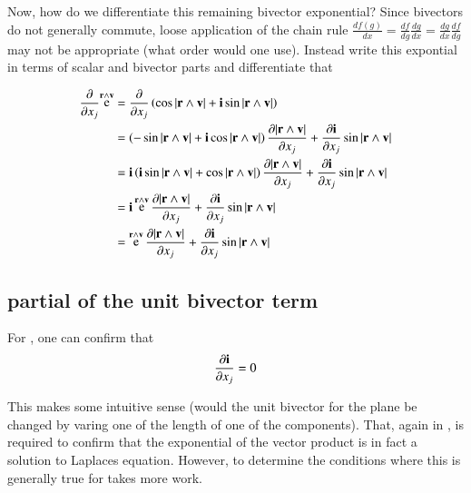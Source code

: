 \documentclass{article}      %
\newcommand{\dxj}[2] {\frac {\partial {#1}} {\partial {x_{#2}}}}
\DeclareMathOperator{\Exp}{e}
\begin{document}
Now, how do we differentiate this remaining bivector exponential?  Since bivectors do not generally commute, loose application of the 
chain rule $\frac{df(g)}{dx} = \frac{df}{dg}\frac{dg}{dx} = \frac{dg}{dx}\frac{df}{dg}$ may not be appropriate (what order would one use).  Instead
write this expontial in terms of scalar and bivector parts and differentiate that

\begin{align*}
\dxj{}{j}{\Exp^{\Br \wedge \Bv}} 
&= \dxj{}{j} \left( \cos{\abs{\Br \wedge \Bv}} + \Bi \sin{\abs{\Br \wedge \Bv}} \right) \\
&= \left(-\sin{\abs{\Br \wedge \Bv}} + \Bi \cos{\abs{\Br \wedge \Bv}} \right)\dxj{\abs{\Br \wedge \Bv}}{j} + \dxj{\Bi}{j} \sin{\abs{\Br \wedge \Bv}} \\
&= \Bi\left(\Bi\sin{\abs{\Br \wedge \Bv}} + \cos{\abs{\Br \wedge \Bv}} \right)\dxj{\abs{\Br \wedge \Bv}}{j} + \dxj{\Bi}{j} \sin{\abs{\Br \wedge \Bv}} \\
&= \Bi\Exp^{\Br \wedge \Bv} \dxj{\abs{\Br \wedge \Bv}}{j} + \dxj{\Bi}{j} \sin{\abs{\Br \wedge \Bv}} \\
&= \Exp^{\Br \wedge \Bv} \dxj{\abs{\Br \wedge \Bv}}{j} + \dxj{\Bi}{j} \sin{\abs{\Br \wedge \Bv}} \\
\end{align*}

\subsection{ partial of the unit bivector term }
For , one can confirm that 
\[
\dxj{\Bi}{j} = 0 
\]

This makes some intuitive sense (would the unit bivector for the plane be changed by varing one of the length of one of the components).
That, again in , is required to confirm that the exponential of the vector product is in fact a solution to Laplaces equation.
However, to determine the conditions where this is generally true for  takes more work.
\end{document}
